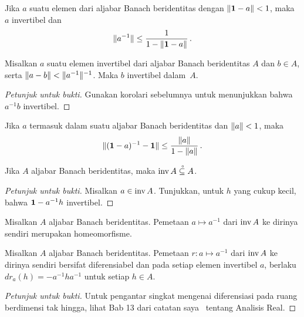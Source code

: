 \begin{cor}\label{cor_Neumann_series} Jika $a$ suatu elemen dari aljabar Banach beridentitas dengan $\lVert\mathbf{1} - a\rVert < 1$, maka $a$ invertibel dan
    \[ \lVert a^{-1}\rVert \le \frac{1}{1 - \lVert\mathbf{1} - a\rVert}\,.  \]
\end{cor}

\begin{cor}\label{cor2_Neumann_series} Misalkan $a$ suatu elemen invertibel dari aljabar Banach beridentitas $A$ dan $b \in A$,
serta $\lVert a - b\rVert < \lVert a^{-1}\rVert^{-1}$. Maka $b$ invertibel dalam~$A$.
\end{cor}

\begin{proof}[\emph{Petunjuk untuk bukti}] Gunakan korolari sebelumnya untuk menunjukkan bahwa $a^{-1}b$ invertibel.
\ns \end{proof}

\begin{cor} Jika $a$ termasuk dalam suatu aljabar Banach beridentitas dan $\lVert a\rVert < 1$, maka
   \[ \lVert(\mathbf{1} - a)^{-1} - \mathbf{1}\rVert \le \frac{\lVert a\rVert}{1 - \lVert a\rVert}\,. \]
\end{cor}

\begin{prop}\label{000644fa} Jika $A$ aljabar Banach beridentitas, maka $\operatorname{inv} A\overset{\thickspace{}_\circ}{\subseteq}A$.
\end{prop}

\begin{proof}[\emph{Petunjuk untuk bukti}] Misalkan $a \in \operatorname{inv} A$. Tunjukkan, untuk $h$ yang cukup kecil,
bahwa $\mathbf{1} - a^{-1}h$ invertibel.  \ns
\end{proof}

\begin{prop}\label{000646fa} Misalkan $A$ aljabar Banach beridentitas. Pemetaan $a \mapsto a^{-1}$ dari $\operatorname{inv} A$ ke
dirinya sendiri merupakan homeomorfisme.
\end{prop}

\begin{prop} Misalkan $A$ aljabar Banach beridentitas. Pemetaan $r\colon a \mapsto a^{-1}$ dari
$\operatorname{inv} A$ ke dirinya sendiri bersifat diferensiabel dan pada setiap elemen invertibel $a$, berlaku
$dr_a(h) = -a^{-1}ha^{-1}$ untuk setiap $h \in A$.
\end{prop}

\begin{proof}[\emph{Petunjuk untuk bukti}] Untuk pengantar singkat mengenai diferensiasi pada ruang
berdimensi tak hingga, lihat Bab 13 dari catatan saya~\cite{Erdman:2007} tentang Analisis Real.  \ns
\end{proof}

